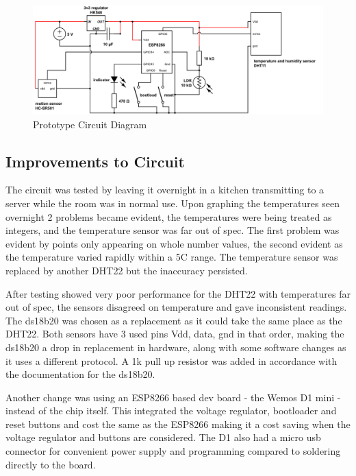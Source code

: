 \documentclass[bsc,frontabs,twoside,singlespacing,parskip,deptreport]{infthesis}
\begin{document}
\begin{center}
\begin{figure}[ht]
\label{initial}
\includegraphics[scale=0.6]{initial_circuit.png} 
\caption{Prototype Circuit Diagram}
\end{figure}
\end{center}

\subsection{Improvements to Circuit}
The circuit was tested by leaving it overnight in a kitchen transmitting to a server while the room was in normal use. Upon graphing the temperatures seen overnight 2 problems became evident, the temperatures were being treated as integers, and the temperature sensor was far out of spec. The first problem was evident by points only appearing on whole number values, the second evident as the temperature varied rapidly within a 5\degree C range. The temperature sensor was replaced by another DHT22 but the inaccuracy persisted.

After testing showed very poor performance for the DHT22 with temperatures far out of spec, the sensors disagreed on temperature and gave inconsistent readings. The ds18b20 was chosen as a replacement as it could take the same place as the DHT22. Both sensors have 3 used pins Vdd, data, gnd in that order, making the ds18b20 a drop in replacement in hardware, along with some software changes as it uses a different protocol. A 1k pull up resistor was added in accordance with the documentation for the ds18b20. 

Another change was using an ESP8266 based dev board - the Wemos D1 mini - instead of the chip itself. This integrated the voltage regulator, bootloader and reset buttons and cost the same as the ESP8266 making it a cost saving when the voltage regulator and buttons are considered. The D1 also had a micro usb connector for convenient power supply and programming compared to soldering directly to the board.
\end{document}
